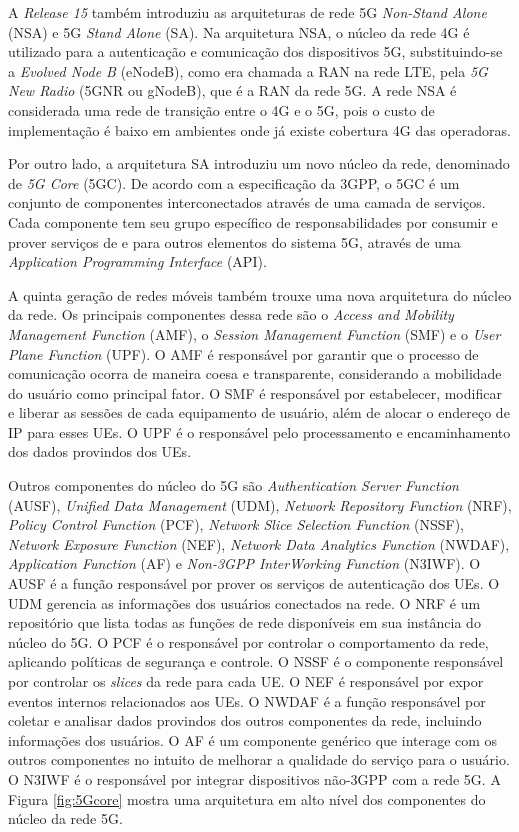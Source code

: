 A \textit{Release 15} também introduziu as arquiteturas de rede 5G \textit{Non-Stand  Alone} (NSA) e 5G \textit{Stand Alone} (SA).
Na arquitetura NSA, o núcleo da rede 4G é utilizado para a autenticação e comunicação dos dispositivos 5G, substituindo-se a \textit{Evolved Node B} (eNodeB), como era chamada a RAN na rede LTE, pela \textit{5G New Radio} (5GNR ou gNodeB), que é a RAN da rede 5G.
A rede NSA é considerada uma rede de transição entre o 4G e o 5G, pois o custo de implementação é baixo em ambientes onde já existe cobertura 4G das operadoras.

Por outro lado, a arquitetura SA introduziu um novo núcleo da rede, denominado de \textit{5G Core} (5GC).
De acordo com a especificação da 3GPP, o 5GC é um conjunto de componentes interconectados através de uma camada de serviços. Cada componente tem seu grupo específico de responsabilidades por consumir e prover serviços de e para outros elementos do sistema 5G, através de uma \textit{Application Programming Interface} (API).

A quinta geração de redes móveis também trouxe uma nova arquitetura do núcleo da rede. Os principais componentes dessa rede são o \textit{Access and Mobility Management Function} (AMF), o \textit{Session Management Function} (SMF) e o \textit{User Plane Function} (UPF).
O AMF é responsável por garantir que o processo de comunicação ocorra de maneira coesa e transparente, considerando a mobilidade do usuário como principal fator.
O SMF é responsável por estabelecer, modificar e liberar as sessões de cada equipamento de usuário, além de alocar o endereço de IP para esses UEs.
O UPF é o responsável pelo processamento e encaminhamento dos dados provindos dos UEs.

Outros componentes do núcleo do 5G são \textit{Authentication Server Function} (AUSF), \textit{Unified Data Management} (UDM), \textit{Network Repository Function} (NRF), \textit{Policy Control Function} (PCF), \textit{Network Slice Selection Function} (NSSF), \textit{Network Exposure Function} (NEF), \textit{Network Data Analytics Function} (NWDAF), \textit{Application Function} (AF) e \textit{Non-3GPP InterWorking Function} (N3IWF).
O AUSF é a função responsável por prover os serviços de autenticação dos UEs.
O UDM gerencia as informações dos usuários conectados na rede.
O NRF é um repositório que lista todas as funções de rede disponíveis em sua instância do núcleo do 5G.
O PCF é o responsável por controlar o comportamento da rede, aplicando políticas de segurança e controle.
O NSSF é o componente responsável por controlar os \textit{slices} da rede para cada UE.
O NEF é responsável por expor eventos internos relacionados aos UEs.
O NWDAF é a função responsável por coletar e analisar dados provindos dos outros componentes da rede, incluindo informações dos usuários.
O AF é um componente genérico que interage com os outros componentes no intuito de melhorar a qualidade do serviço para o usuário.
O N3IWF é o responsável por integrar dispositivos não-3GPP com a rede 5G.
A Figura \ref{fig:5Gcore} mostra uma arquitetura em alto nível dos componentes do núcleo da rede 5G.

